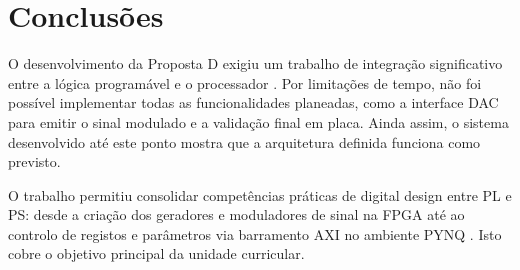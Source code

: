 \chapter{Conclusões}

O desenvolvimento da Proposta D exigiu um trabalho de integração significativo entre a lógica programável e o processador . Por limitações de tempo, não foi possível implementar todas as funcionalidades planeadas, como a interface DAC para emitir o sinal modulado e a validação final em placa. Ainda assim, o sistema desenvolvido até este ponto mostra que a arquitetura definida funciona como previsto.

O trabalho permitiu consolidar competências práticas de digital design entre PL e PS: desde a criação dos geradores e moduladores de sinal na FPGA até ao controlo de registos e parâmetros via barramento AXI no ambiente PYNQ . Isto cobre o objetivo principal da unidade curricular.
